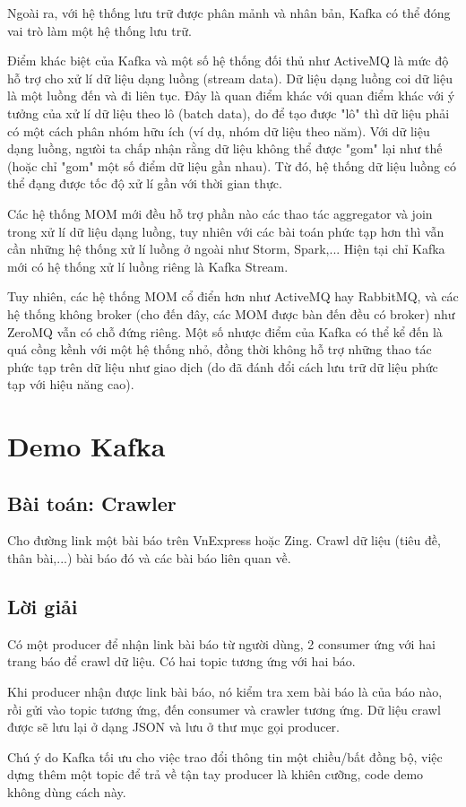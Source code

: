 \documentclass{article}
\begin{document}
Ngoài ra, với hệ thống lưu trữ được phân mảnh và nhân bản, Kafka có thể đóng vai
trò làm một hệ thống lưu trữ.

Điểm khác biệt của Kafka và một số hệ thống đối thủ như ActiveMQ là mức độ hỗ
trợ cho xử lí dữ liệu dạng luồng (stream data). Dữ liệu dạng luồng coi dữ liệu
là một luồng đến và đi liên tục. Đây là quan điểm khác với quan điểm khác với ý
tưởng của xử lí dữ liệu theo lô (batch data), do để tạo được "lô" thì dữ liệu
phải có một cách phân nhóm hữu ích (ví dụ, nhóm dữ liệu theo năm). Với dữ liệu
dạng luồng, ngưòi ta chấp nhận rằng dữ liệu không thể được "gom" lại như thế
(hoặc chỉ "gom" một số điểm dữ liệu gần nhau). Từ đó, hệ thống dữ liệu luồng có
thể đạng được tốc độ xử lí gần với thời gian thực.

Các hệ thống MOM mới đều hỗ trợ phần nào các thao tác aggregator và join trong
xử lí dữ liệu dạng luồng, tuy nhiên với các bài toán phức tạp hơn thì vẫn cần
những hệ thống xử lí luồng ở ngoài như Storm, Spark,... Hiện tại chỉ Kafka mới
có hệ thống xử lí luồng riêng là Kafka Stream.

Tuy nhiên, các hệ thống MOM cổ điển hơn như ActiveMQ hay RabbitMQ, và các hệ
thống không broker (cho đến đây, các MOM được bàn đến đều có broker) như ZeroMQ
vẫn có chỗ đứng riêng. Một số nhược điểm của Kafka có thể kể đến là quá cồng
kềnh với một hệ thống nhỏ, đồng thời không hỗ trợ những thao tác phức tạp trên
dữ liệu như giao dịch (do đã đánh đổi cách lưu trữ dữ liệu phức tạp với hiệu
năng cao).

\section{Demo Kafka}

\subsection{Bài toán: Crawler}

Cho đường link một bài báo trên VnExpress hoặc Zing. Crawl dữ liệu (tiêu đề,
thân bài,...) bài báo đó và các bài báo liên quan về.

\subsection{Lời giải}

Có một producer để nhận link bài báo từ người dùng, 2 consumer ứng với hai trang
báo để crawl dữ liệu. Có hai topic tương ứng với hai báo.

Khi producer nhận được link bài báo, nó kiểm tra xem bài báo là của báo nào, rồi
gửi vào topic tương ứng, đến consumer và crawler tương ứng. Dữ liệu crawl được
sẽ lưu lại ở dạng JSON và lưu ở thư mục gọi producer.

Chú ý do Kafka tối ưu cho việc trao đổi thông tin một chiều/bất đồng bộ, việc
dựng thêm một topic để trả về tận tay producer là khiên cưỡng, code demo không
dùng cách này.

\printbibliography
\end{document}
